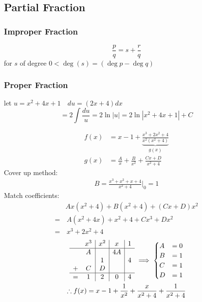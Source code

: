 	\subsection{Partial Fraction}
		\subsubsection{Improper Fraction}
			\begin{theorem}
				$$\frac pq=s+\frac rq$$
				for $s$ of degree $0<\deg(s)=(\deg p-\deg q)$
			\end{theorem}
		\subsubsection{Proper Fraction}
			\begin{example}
				let $u=x^2+4x+1\quad du=(2x+4)dx$
				$$=2\int\frac{du}u=2\ln|u|=2\ln|x^2+4x+1|+C$$
			\end{example}
			\begin{example}[$\displaystyle f(x)=\frac{x^5-x^4+5x^5-2x^2+4}{x^4+4x^2}$]
				\begin{align*}
					f(x)&=x-1+\underbrace{\frac{x^3+2x^2+4}{x^2(x^2+4)}}_{g(x)}\tag*{(div \& factorise)}\\
					g(x)&=\frac Ax+\frac B{x^2}+\frac{Cx+D}{x^2+4}
				\end{align*}
				Cover up method: 
				\begin{align*}
					B=\frac{x^3+x^2+x+4}{x^2+4}\Big|_0=1\tag*{($x=0\implies x^2=0$)}
				\end{align*}
				Match coefficients:
				\begin{align*}
					&Ax(x^2+4)+B(x^2+4)+(Cx+D)x^2\\
					=&\,A(x^2+4x)+x^2+4+Cx^3+Dx^2\\
					=&\,x^3+2x^2+4
				\end{align*}
				\begin{gather*}
					\begin{array}{cc|c|c|c}
						&x^3&x^2&x&1\\\hline
						&A&&4A&\\ &&1&&4\\ +&C&D&&\\\hline
						=&1&2&0&4\\
					\end{array}\implies\begin{cases}
						A&=0\\ B&=1\\ C&=1\\ D&=1
					\end{cases}\\
					\therefore f(x)=x-1+\frac1{x^2}+\frac x{x^2+4}+\frac1{x^2+4}
				\end{gather*}
			\end{example}
